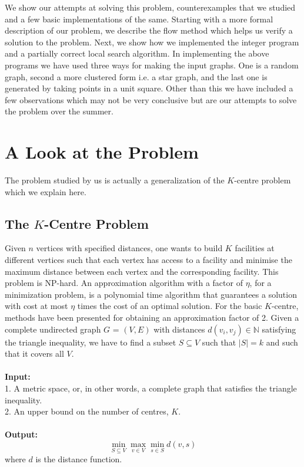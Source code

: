\documentclass[12pt,a4paper,onecolumn]{article}
\begin{document}
We show our attempts at solving this problem, counterexamples that we studied and a few basic implementations of the same. Starting with a more formal description of our problem, we describe the flow method which helps us verify a solution to the problem. Next, we show how we implemented the integer program and a partially correct local search algorithm. In implementing the above programs we have used three ways for making the input graphs. One is a random graph, second a more clustered form i.e. a star graph, and the last one is generated by taking points in a unit square. Other than this we have included a few observations which may not be very conclusive but are our attempts to solve the problem over the summer.
\section{A Look at the Problem}
The problem studied by us is actually a generalization of the $K$-centre problem which we explain here. 
\subsection{The $K$-Centre Problem}
Given $n$ vertices with specified distances, one wants to build $K$ facilities at different vertices such that each vertex has access to a facility and minimise the maximum distance between each vertex and the corresponding facility. This problem is NP-hard. An approximation algorithm with a factor of $\eta$, for a minimization problem, is a polynomial time algorithm that guarantees a solution with cost at most $\eta$ times the cost of an optimal solution. For the basic $K$-centre, methods have been presented for obtaining an approximation factor of 2. Given a complete undirected graph $G$ = $(V, E)$ with distances $d(v_i, v_j) \in \mathbb{N}$ satisfying the triangle inequality, we have to find a subset $S \subseteq V$ such that $|S| = k$ and such that it covers all $V$.\\\\
 \textbf{Input:}\\1. A metric space, or, in other words, a complete graph that satisfies the triangle inequality.\\2. An upper bound on the number of centres, $K$.\\\\
\textbf{Output:}\\
$$\min_{S \subseteq V}\max_{v \in V}\min_{s \in S}d(v,s)$$
where $d$ is the distance function.
\end{document}
